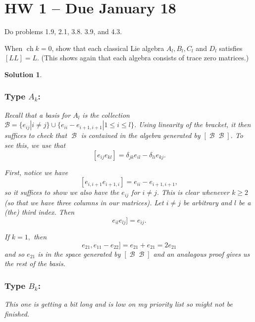 \documentclass[12pt]{article}
\newenvironment{hwprob}[1]
{\renewcommand{\theprob}{#1}%
 \addtocounter{thm}{-1}%
 \begin{prob}}
{\end{prob}}
\theoremstyle{nonumberbreak}
\newtheorem{sol}{Solution}
\theoremstyle{changebreak}
\theoremstyle{nonumberbreak}
\theoremstyle{change}
\DeclareMathOperator{\ch}{ch}
\DeclareMathOperator{\calB}{\mathcal{B}}
\begin{document}
\newpage

\section*{HW 1 -- Due January 18}
Do problems 1.9, 2.1, 3.8. 3.9, and 4.3.

\begin{hwprob}{1.9}
	When $\ch k=0$, show that each classical Lie algebra $A_l,B_l, C_l$ and $D_l$ satisfies $[LL]=L$. (This shows again that each algebra consists of trace zero matrices.)
\end{hwprob}
\begin{sol}
	\subsubsection*{Type $A_k$:}
	Recall that a basis for $A_l$ is the collection $\mathcal{B}=\{e_{ij}|i\ne j\}\cup\{e_{ii}-e_{i+1,i+1}|1\le i\le l\}$. Using linearity of the bracket,
	it then suffices to check that $\calB$ is contained in the algebra generated by $[\calB \calB]$. To see this, we use that
	\[[e_{ij}e_{kl}]=\delta_{jk}e_{il}-\delta_{li}e_{kj}.\]

	First, notice we have
	\[[e_{i,i+1}e_{i+1,i}]=e_{ii}-e_{i+1,i+1},\]
	so it suffices to show we also have the $e_{ij}$ for $i\ne j$.
	This is clear whenever $k\ge 2$ (so that we have three columns in our matrices). Let $i\ne j$ be arbitrary
	and $l$ be a (the) third index. Then 
	\[e_{il}e_{lj}]=e_{ij}.\]

	If $k=1,$ then 
	\[e_{21},e_{11}-e_{22}]=e_{21}+e_{21}=2e_{21}\]
	and so $e_{21}$ is in the space generated by $[\calB \calB]$ and an analagous proof
	gives us the rest of the basis.

	\subsubsection*{Type $B_k$:}
	This one is getting a bit long and is low on my priority list so might not be finished.
\end{sol}
\end{document}
